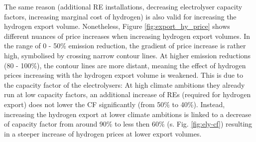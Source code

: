 The same reason (additional RE installations, decreasing electrolyser capacity factors, increasing marginal cost of hydrogen) is also valid for increasing the hydrogen export volume. Nonetheless, Figure \ref{fig:export_hy_price} shows different nuances of price increases when increasing hydrogen export volumes. In the range of 0 - 50\% emission reduction, the gradient of price increase is rather high, symbolised by crossing narrow contour lines. At higher emission reductions (80 - 100\%), the contour lines are more distant, meaning the effect of hydrogen prices increasing with the hydrogen export volume is
weakened. This is due to the capacity factor of the electrolysers: At high climate ambitions they already run at low capacity factors, an additional increase of REs (required for hydrogen export) does not lower the CF significantly (from 50\% to 40\%). Instead, increasing the hydrogen export at lower climate ambitions is linked to a decrease of capacity factor from around 90\% to less then 60\%  (s. Fig. \ref{fig:ely-cf}) resulting in a steeper increase of hydrogen prices at lower export volumes.








